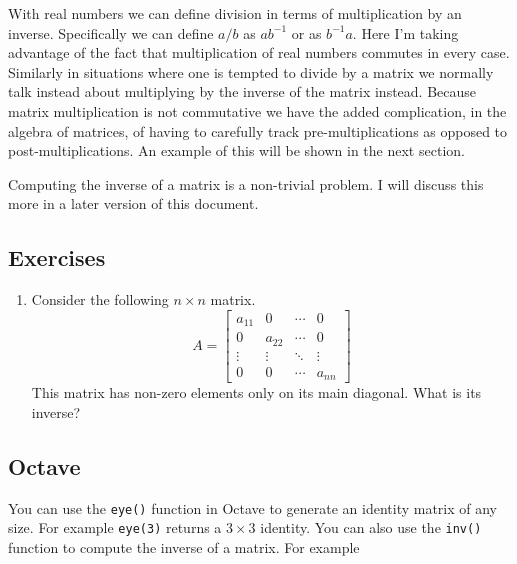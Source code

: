 
With real numbers we can define division in terms of multiplication by an inverse. Specifically
we can define $a/b$ as $ab^{-1}$ or as $b^{-1}a$. Here I'm taking advantage of the fact that
multiplication of real numbers commutes in every case. Similarly in situations where one is
tempted to divide by a matrix we normally talk instead about multiplying by the inverse of the
matrix instead. Because matrix multiplication is not commutative we have the added complication,
in the algebra of matrices, of having to carefully track pre-multiplications as opposed to
post-multiplications. An example of this will be shown in the next section.

Computing the inverse of a matrix is a non-trivial problem. I will discuss this more in a later
version of this document.


\subsection*{Exercises}

\begin{enumerate}

\item Consider the following $n \times n$ matrix.
\begin{displaymath}
A = \left[
\begin{array}{cccc}
  a_{11} & 0 & \cdots & 0 \\
  0 & a_{22} & \cdots & 0 \\
  \vdots & \vdots & \ddots & \vdots \\
  0 & 0 & \cdots & a_{nn}
\end{array}
    \right]
\end{displaymath}
This matrix has non-zero elements only on its main diagonal. What is its inverse?

\end{enumerate}

\subsection*{Octave}

You can use the \texttt{eye()} function in Octave to generate an identity matrix of any size.
For example \texttt{eye(3)} returns a $3 \times 3$ identity. You can also use the \texttt{inv()}
function to compute the inverse of a matrix. For example

